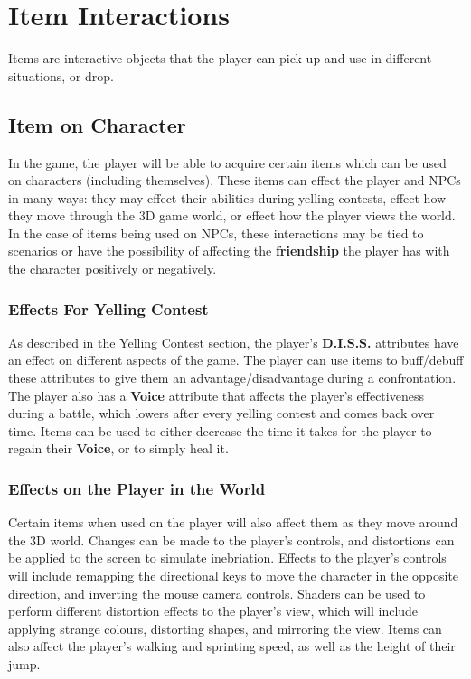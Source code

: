 \section{Item Interactions}
\label{sec:items}
Items are interactive objects that the player can pick up and use in different situations, or drop.

\subsection{Item on Character}
In the game, the player will be able to acquire certain items which can be used on characters (including themselves). These items can effect the player and NPCs in many ways: they may effect their abilities during yelling contests, effect how they move through the 3D game world, or effect how the player views the world. In the case of items being used on NPCs, these interactions may be tied to scenarios or have the possibility of affecting the \textbf{friendship} the player has with the character positively or negatively.

\subsubsection{Effects For Yelling Contest}
As described in the Yelling Contest section, the player's \textbf{D.I.S.S.} attributes have an effect on different aspects of the game. The player can use items to buff/debuff these attributes to give them an advantage/disadvantage during a confrontation. The player also has a \textbf{Voice} attribute that affects the player's effectiveness during a battle, which lowers after every yelling contest and comes back over time. Items can be used to either decrease the time it takes for the player to regain their \textbf{Voice}, or to simply heal it.

\subsubsection{Effects on the Player in the World}
Certain items when used on the player will also affect them as they move around the 3D world. Changes can be made to the player's controls, and distortions can be applied to the screen to simulate inebriation. Effects to the player's controls will include remapping the directional keys to move the character in the opposite direction, and inverting the mouse camera controls. Shaders can be used to perform different distortion effects to the player's view, which will include applying strange colours, distorting shapes, and mirroring the view. Items can also affect the player's walking and sprinting speed, as well as the height of their jump.

